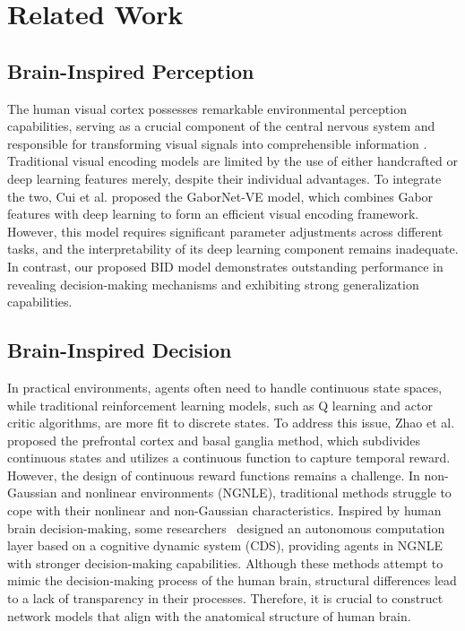 \section{Related Work}

\subsection{Brain-Inspired Perception}
\hspace{1pc}The human visual cortex possesses remarkable environmental perception capabilities, serving as a crucial component of the central nervous system and responsible for transforming visual signals into comprehensible information \cite{9134376}. 
Traditional visual encoding models are limited by the use of either handcrafted or deep learning features merely, despite their individual advantages\cite{kubilius2019brain}. 
To integrate the two, Cui et al. \cite{8574054} proposed the GaborNet-VE model, which combines Gabor features with deep learning to form an efficient visual encoding framework. 
However, this model requires significant parameter adjustments across different tasks, and the interpretability of its deep learning component remains inadequate\cite{liao2021statistical}. 
In contrast, our proposed BID model demonstrates outstanding performance in revealing decision-making mechanisms and exhibiting strong generalization capabilities.

\subsection{Brain-Inspired Decision}
\hspace{1pc}In practical environments, agents often need to handle continuous state spaces, while traditional reinforcement learning models, such as Q learning and actor critic algorithms, are more fit to discrete states\cite{xi2020automatic}. 
To address this issue, Zhao et al. \cite{zhao2018brain} proposed the prefrontal cortex and basal ganglia method, which subdivides continuous states and utilizes a continuous function to capture temporal reward. 
However, the design of continuous reward functions remains a challenge. 
In non-Gaussian and nonlinear environments (NGNLE), traditional methods struggle to cope with their nonlinear and non-Gaussian characteristics\cite{naghshvarianjahromi2020natural}. 
Inspired by human brain decision-making, some researchers~\cite{8932505} designed an autonomous computation layer based on a cognitive dynamic system (CDS), providing agents in NGNLE with stronger decision-making capabilities. 
Although these methods attempt to mimic the decision-making process of the human brain, structural differences lead to a lack of transparency in their processes. 
Therefore, it is crucial to construct network models that align with the anatomical structure of human brain.


